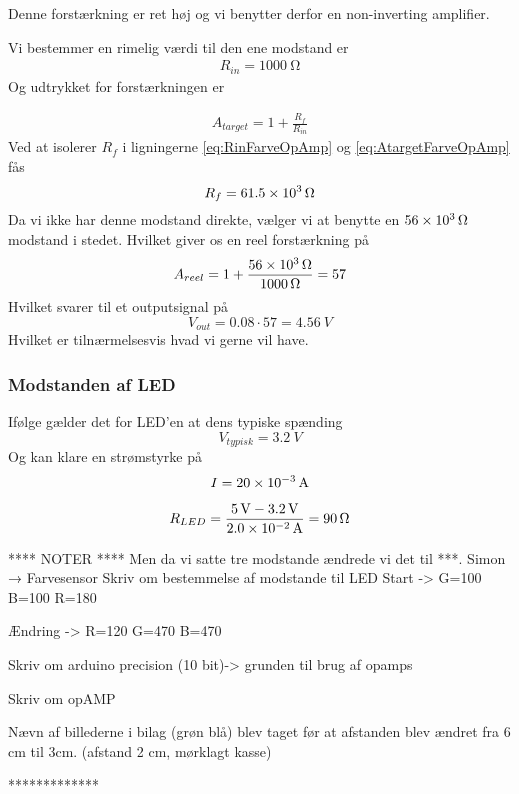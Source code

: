 Denne forstærkning er ret høj og vi benytter derfor en non-inverting amplifier.

Vi bestemmer en rimelig værdi til den ene modstand er
\begin{align}
	R_{in} = \SI{1000}{\ohm} \label{eq:RinFarveOpAmp}
\end{align}
Og udtrykket for forstærkningen er

\begin{align}
	A_{target} = 1+\frac{R_f}{R_{in}} \label{eq:AtargetFarveOpAmp}
\end{align}
Ved at isolerer $R_f$ i ligningerne \ref{eq:RinFarveOpAmp} og \ref{eq:AtargetFarveOpAmp} fås
\[
	R_f = \SI{61.5d3}{\ohm}
\]
Da vi ikke har denne modstand direkte, vælger vi at benytte en $\SI{56d3}{\ohm}$ modstand i stedet. Hvilket giver os en reel forstærkning på
\[
	A_{reel} = 1 + \frac{\SI{56d3}{\ohm}}{\SI{1000}{\ohm}} = 57	
\]
Hvilket svarer til et outputsignal på
\[
	V_{out} = \SI{0.08}\cdot 57 = \SI{4.56}{V}
\]
Hvilket er tilnærmelsesvis hvad vi gerne vil have.

\subsubsection{Modstanden af LED}
Ifølge \cite{LED??} gælder det for LED'en at dens typiske spænding 
\[
	V_{typisk} = \SI{3.2}{V}
\]
Og kan klare en strømstyrke på
\[
	I = \SI{20d-3}{A} 
\]

\begin{align}
	R_{LED} &= \frac{\SI{5}{V}-\SI{3.2}{V}}{\SI{2.0d-2}{A}} = \SI{90}{\ohm}\\
\end{align}

**** NOTER ****
Men da vi satte tre modstande ændrede vi det til ***. 
Simon → Farvesensor
Skriv om bestemmelse af modstande til LED
Start ->
G=100
B=100
R=180

Ændring ->
R=120
G=470
B=470

Skriv om arduino precision (10 bit)-> grunden til brug af opamps

Skriv om opAMP


Nævn af billederne i bilag (grøn blå) blev taget før at afstanden blev ændret fra 6 cm til 3cm.
(afstand 2 cm, mørklagt kasse)

*************
